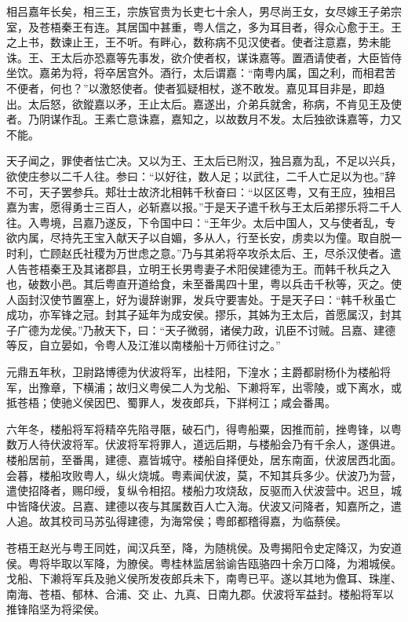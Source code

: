 \documentclass[12pt,UTF8]{ctexbook}
\begin{document}
相吕嘉年长矣，相三王，宗族官贵为长吏七十余人，男尽尚王女，女尽嫁王子弟宗室，及苍梧秦王有连。其居国中甚重，粤人信之，多为耳目者，得众心愈于王。王之上书，数谏止王，王不听。有畔心，数称病不见汉使者。使者注意嘉，势未能诛。王、王太后亦恐嘉等先事发，欲介使者权，谋诛嘉等。置酒请使者，大臣皆侍坐饮。嘉弟为将，将卒居宫外。酒行，太后谓嘉：“南粤内属，国之利，而相君苦不便者，何也？”以激怒使者。使者狐疑相杖，遂不敢发。嘉见耳目非是，即趋出。太后怒，欲鏦嘉以矛，王止太后。嘉遂出，介弟兵就舍，称病，不肯见王及使者。乃阴谋作乱。王素亡意诛嘉，嘉知之，以故数月不发。太后独欲诛嘉等，力又不能。



天子闻之，罪使者怯亡决。又以为王、王太后已附汉，独吕嘉为乱，不足以兴兵，欲使庄参以二千人往。参曰：“以好往，数人足；以武往，二千人亡足以为也。”辞不可，天子罢参兵。郏壮士故济北相韩千秋奋曰：“以区区粤，又有王应，独相吕嘉为害，愿得勇士三百人，必斩嘉以报。”于是天子遣千秋与王太后弟摎乐将二千人往。入粤境，吕嘉乃遂反，下令国中曰：“王年少。太后中国人，又与使者乱，专欲内属，尽持先王宝入献天子以自媚，多从人，行至长安，虏卖以为僮。取自脱一时利，亡顾赵氏社稷为万世虑之意。”乃与其弟将卒攻杀太后、王，尽杀汉使者。遣人告苍梧秦王及其诸郡县，立明王长男粤妻子术阳侯建德为王。而韩千秋兵之入也，破数小邑。其后粤直开道给食，未至番禺四十里，粤以兵击千秋等，灭之。使人函封汉使节置塞上，好为谩辞谢罪，发兵守要害处。于是天子曰：“韩千秋虽亡成功，亦军锋之冠。封其子延年为成安侯。摎乐，其姊为王太后，首愿属汉，封其子广德为龙侯。”乃赦天下，曰：“天子微弱，诸侯力政，讥臣不讨贼。吕嘉、建德等反，自立晏如，令粤人及江淮以南楼船十万师往讨之。”



元鼎五年秋，卫尉路博德为伏波将军，出桂阳，下湟水；主爵都尉杨仆为楼船将军，出豫章，下横浦；故归义粤侯二人为戈船、下濑将军，出零陵，或下离水，或抵苍梧；使驰义侯因巴、蜀罪人，发夜郎兵，下牂柯江；咸会番禺。



六年冬，楼船将军将精卒先陷寻陿，破石门，得粤船粟，因推而前，挫粤锋，以粤数万人待伏波将军。伏波将军将罪人，道远后期，与楼船会乃有千余人，遂俱进。楼船居前，至番禺，建德、嘉皆城守。楼船自择便处，居东南面，伏波居西北面。会暮，楼船攻败粤人，纵火烧城。粤素闻伏波，莫，不知其兵多少。伏波乃为营，遣使招降者，赐印绶，复纵令相招。楼船力攻烧敌，反驱而入伏波营中。迟旦，城中皆降伏波。吕嘉、建德以夜与其属数百人亡入海。伏波又问降者，知嘉所之，遣人追。故其校司马苏弘得建德，为海常侯；粤郎都稽得嘉，为临蔡侯。



苍梧王赵光与粤王同姓，闻汉兵至，降，为随桃侯。及粤揭阳令史定降汉，为安道侯。粤将毕取以军降，为膫侯。粤桂林监居翁谕告瓯骆四十余万口降，为湘城侯。戈船、下濑将军兵及驰义侯所发夜郎兵未下，南粤已平。遂以其地为儋耳、珠崖、南海、苍梧、郁林、合浦、交止、九真、日南九郡。伏波将军益封。楼船将军以推锋陷坚为将梁侯。
\end{document}
